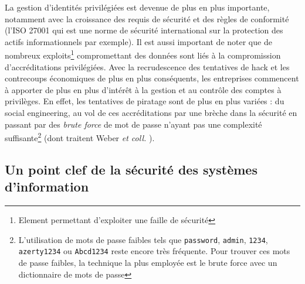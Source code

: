 La gestion d’identités privilégiées est devenue de plus en plus importante, notamment avec la croissance des requis de sécurité et des règles de conformité (l’ISO 27001 qui est une norme de sécurité international sur la protection des actifs informationnels par exemple). Il est aussi important de noter que de nombreux exploits\footnote{Element permettant d'exploiter une faille de sécurité} compromettant des données sont liés à la compromission d’accréditations privilégiées. Avec la recrudescence des tentatives de hack et les contrecoups économiques de plus en plus conséquents, les entreprises commencent à apporter de plus en plus d’intérêt à la gestion et au contrôle des comptes à privilèges. En effet, les tentatives de piratage sont de plus en plus variées : du social engineering, au vol de ces accréditations par une brèche dans la sécurité en passant par des \textit{brute force} de mot de passe n’ayant pas une complexité suffisante\footnote{L'utilisation de mots de passe faibles tels que \texttt{password}, \texttt{admin}, \texttt{1234}, \texttt{azerty1234} ou \texttt{Abcd1234} reste encore très fréquente. Pour trouver ces mots de passe faibles, la technique la plus employée est le brute force avec un dictionnaire de mots de passe} (dont traitent Weber \emph{et coll.} \cite{jew}).\\

\subsection{Un point clef de la sécurité des systèmes d'information}

